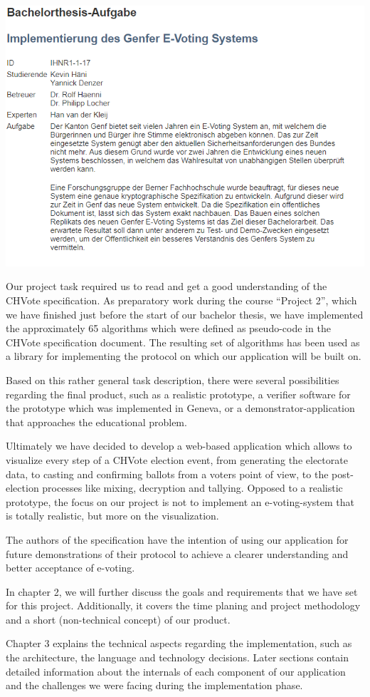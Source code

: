 \begin{center}
\includegraphics[scale=0.95]{assets/aufgabe.PNG}
\label{Bachelor thesis task}%
\end{center}

Our project task required us to read and get a good understanding of the CHVote specification. As preparatory work during the course "`Project 2"', which we have finished just before the start of our bachelor thesis, we have implemented the approximately 65 algorithms which were defined as pseudo-code in the CHVote specification document. The resulting set of algorithms has been used as a library for implementing the protocol on which our application will be built on.

Based on this rather general task description, there were several possibilities regarding the final product, such as a realistic prototype, a verifier software for the prototype which was implemented in Geneva, or a demonstrator-application that approaches the educational problem. 

Ultimately we have decided to develop a web-based application which allows to visualize every step of a CHVote election event, from generating the electorate data, to casting and confirming ballots from a voters point of view, to the post-election processes like mixing, decryption and tallying. Opposed to a realistic prototype, the focus on our project is not to implement an e-voting-system that is totally realistic, but more on the visualization.  

The authors of the specification have the intention of using our application for future demonstrations of their protocol to achieve a clearer understanding and better acceptance of e-voting.

In chapter 2, we will further discuss the goals and requirements that we have set for this project. Additionally, it covers the time planing and project methodology and a short (non-technical concept) of our product.

Chapter 3 explains the technical aspects regarding the implementation, such as the architecture, the language and technology decisions. Later sections contain detailed information about the internals of each component of our application and the challenges we were facing during the implementation phase. 